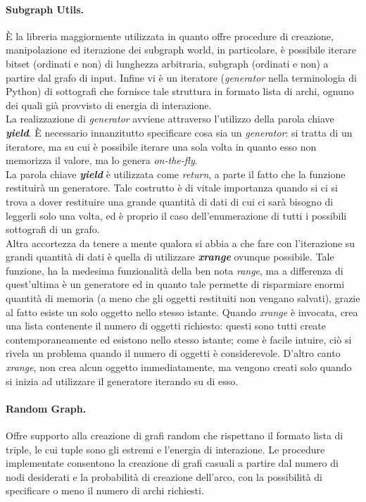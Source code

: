 \paragraph{Subgraph Utils.}
È la libreria maggiormente utilizzata in quanto offre procedure di creazione, manipolazione ed iterazione dei subgraph world, in particolare, è possibile iterare bitset (ordinati e non) di lunghezza arbitraria, subgraph (ordinati e non) a partire dal grafo di input. Infine vi è un iteratore (\textit{generator} nella terminologia di Python) di sottografi che fornisce tale struttura in formato lista di archi, ognuno dei quali già provvisto di energia di interazione.\\
La realizzazione di \textit{generator} avviene attraverso l'utilizzo della parola chiave \textit{\textbf{yield}}. È necessario innanzitutto specificare cosa sia un \textit{generator}: si tratta di un iteratore, ma su cui è possibile iterare una sola volta in quanto esso non memorizza il valore, ma lo genera \textit{on-the-fly}.\\
La parola chiave \textit{\textbf{yield}} è utilizzata come \textit{return}, a parte il fatto che la funzione restituirà un generatore. Tale costrutto è di vitale importanza quando si ci si trova a dover restituire una grande quantità di dati di cui ci sarà bisogno di leggerli solo una volta, ed è proprio il caso dell'enumerazione di tutti i possibili sottografi di un grafo.\\
Altra accortezza da tenere a mente qualora si abbia a che fare con l'iterazione su grandi quantità di dati è quella di utilizzare \textbf{\textit{xrange}} ovunque possibile. Tale funzione, ha la medesima funzionalità della ben nota \textit{range}, ma a differenza di quest'ultima è un generatore ed in quanto tale permette di risparmiare enormi quantità di memoria (a meno che gli oggetti restituiti non vengano salvati), grazie al fatto esiste un solo oggetto nello stesso istante. Quando \textit{xrange} è invocata, crea una lista contenente il numero di oggetti richiesto: questi sono tutti create contemporaneamente ed esistono nello stesso istante; come è facile intuire, ciò si rivela un problema quando il numero di oggetti è considerevole. D'altro canto \textit{xrange}, non crea alcun oggetto immediatamente, ma vengono creati solo quando si inizia ad utilizzare il generatore iterando su di esso.
\paragraph{Random Graph.}
Offre supporto alla creazione di grafi random che rispettano il formato lista di triple, le cui tuple sono gli estremi e l'energia di interazione. Le procedure implementate consentono la creazione di grafi casuali a partire dal numero di nodi desiderati e la probabilità di creazione dell'arco, con la possibilità di specificare o meno il numero di archi richiesti.
